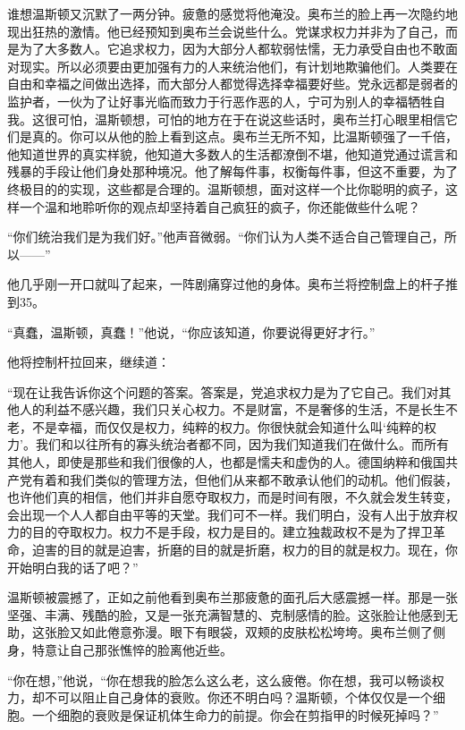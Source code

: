 谁想温斯顿又沉默了一两分钟。疲惫的感觉将他淹没。奥布兰的脸上再一次隐约地现出狂热的激情。他已经预知到奥布兰会说些什么。党谋求权力并非为了自己，而是为了大多数人。它追求权力，因为大部分人都软弱怯懦，无力承受自由也不敢面对现实。所以必须要由更加强有力的人来统治他们，有计划地欺骗他们。人类要在自由和幸福之间做出选择，而大部分人都觉得选择幸福要好些。党永远都是弱者的监护者，一伙为了让好事光临而致力于行恶作恶的人，宁可为别人的幸福牺牲自我。这很可怕，温斯顿想，可怕的地方在于在说这些话时，奥布兰打心眼里相信它们是真的。你可以从他的脸上看到这点。奥布兰无所不知，比温斯顿强了一千倍，他知道世界的真实样貌，他知道大多数人的生活都潦倒不堪，他知道党通过谎言和残暴的手段让他们身处那种境况。他了解每件事，权衡每件事，但这不重要，为了终极目的的实现，这些都是合理的。温斯顿想，面对这样一个比你聪明的疯子，这样一个温和地聆听你的观点却坚持着自己疯狂的疯子，你还能做些什么呢？

``你们统治我们是为我们好。''他声音微弱。``你们认为人类不适合自己管理自己，所
以——''

他几乎刚一开口就叫了起来，一阵剧痛穿过他的身体。奥布兰将控制盘上的杆子推到35。

``真蠢，温斯顿，真蠢！''他说，``你应该知道，你要说得更好才行。''

他将控制杆拉回来，继续道：

``现在让我告诉你这个问题的答案。答案是，党追求权力是为了它自己。我们对其他人的利益不感兴趣，我们只关心权力。不是财富，不是奢侈的生活，不是长生不老，不是幸福，而仅仅是权力，纯粹的权力。你很快就会知道什么叫`纯粹的权力'。我们和以往所有的寡头统治者都不同，因为我们知道我们在做什么。而所有其他人，即使是那些和我们很像的人，也都是懦夫和虚伪的人。德国纳粹和俄国共产党有着和我们类似的管理方法，但他们从来都不敢承认他们的动机。他们假装，也许他们真的相信，他们并非自愿夺取权力，而是时间有限，不久就会发生转变，会出现一个人人都自由平等的天堂。我们可不一样。我们明白，没有人出于放弃权力的目的夺取权力。权力不是手段，权力是目的。建立独裁政权不是为了捍卫革命，迫害的目的就是迫害，折磨的目的就是折磨，权力的目的就是权力。现在，你开始明白我的话了吧？''

温斯顿被震撼了，正如之前他看到奥布兰那疲惫的面孔后大感震撼一样。那是一张坚强、丰满、残酷的脸，又是一张充满智慧的、克制感情的脸。这张脸让他感到无助，这张脸又如此倦意弥漫。眼下有眼袋，双颊的皮肤松松垮垮。奥布兰侧了侧身，特意让自己那张憔悴的脸离他近些。

``你在想，''他说，``你在想我的脸怎么这么老，这么疲倦。你在想，我可以畅谈权力，却不可以阻止自己身体的衰败。你还不明白吗？温斯顿，个体仅仅是一个细胞。一个细胞的衰败是保证机体生命力的前提。你会在剪指甲的时候死掉吗？''

